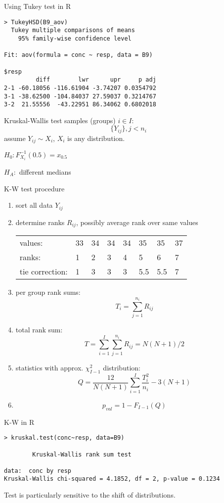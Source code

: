 \documentclass[smaller]{beamer}
\def\xskip{{\vspace{2ex}}}
\begin{document}
\begin{frame}[fragile]{Using Tukey test in R}
\begin{verbatim}
> TukeyHSD(B9_aov)
  Tukey multiple comparisons of means
    95% family-wise confidence level

Fit: aov(formula = conc ~ resp, data = B9)

$resp
         diff        lwr      upr     p adj
2-1 -60.18056 -116.61904 -3.74207 0.0354792
3-1 -38.62500 -104.84037 27.59037 0.3214767
3-2  21.55556  -43.22951 86.34062 0.6802018
\end{verbatim}
 
\end{frame}



\begin{frame}{Kruskal-Wallis test}
samples (groups) $i\in I$:\\
\[
    \{Y_{ij}\}, j< n_i
\]
assume $Y_{ij} \sim X_i$, $X_i$ is any distribution.

\xskip
$H_0: F_{X_i}^{-1}(0.5) = x_{0.5}$

\xskip
$H_A:$ different medians
\end{frame}

\begin{frame}[fragile]{K-W test procedure}
\begin{enumerate}
 \item sort all data $Y_{ij}$
 \item determine ranks $R_{ij}$, possibly average rank over same values\\
 \begin{tabular}{llllllll}
  values:& 33& 34& 34& 34& 35& 35& 37\\
  ranks: & 1 &  2&  3&  4&  5&  6&7\\
  tie correction: & 1 & 3 & 3 & 3 &5.5&5.5& 7
 \end{tabular}
 \item per group rank sums:
 \[
    T_i = \sum_{j=1}^{n_i} R_{ij}
 \]
 \item total rank sum:
 \[
    T = \sum_{i=1}^{I}\sum_{j=1}^{n_i} R_{ij} = N(N+1)/2
 \]
 \item statistics with approx. $\chi^2_{I-1}$ distribution:
 \[
   Q=\frac{12}{N(N+1)} \sum_{i=1}^{I} \frac{T_i^2}{n_i} - 3(N+1)
 \]
 \item 
 \[
   p_{val} = 1 - F_{I-1}(Q)
 \]
\end{enumerate}
\end{frame}

\begin{frame}[fragile]{K-W in R}
\begin{verbatim}
> kruskal.test(conc~resp, data=B9)

        Kruskal-Wallis rank sum test

data:  conc by resp
Kruskal-Wallis chi-squared = 4.1852, df = 2, p-value = 0.1234
\end{verbatim}

\xskip
Test is particularly sensitive to the shift of distributions.
\end{frame}
\end{document}
